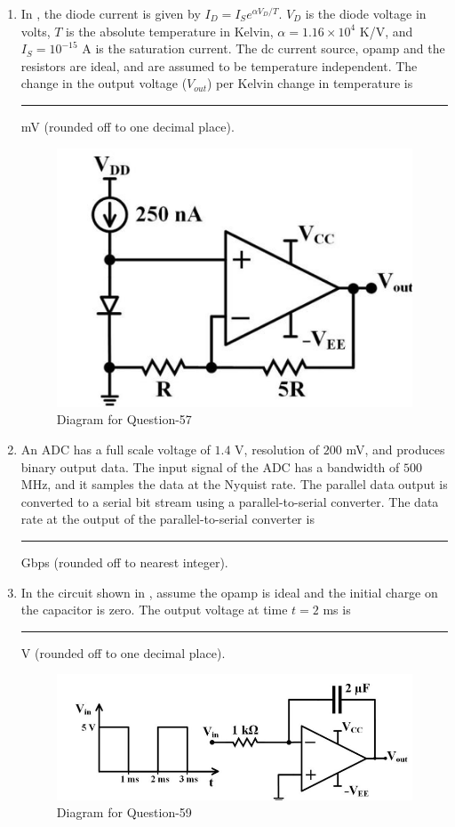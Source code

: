 \documentclass[journal,12pt,onecolumn]{IEEEtran}
\theoremstyle{remark}
\begin{document}
\begin{enumerate}
\item In , the diode current is given by $I_D = I_S e^{\alpha V_D / T}$. $V_D$ is the diode voltage in volts, $T$ is the absolute temperature in Kelvin, $\alpha=1.16 \times 10^{4}$ K/V, and $I_S = 10^{-15}$ A is the saturation current. The dc current source, opamp and the resistors are ideal, and are assumed to be temperature independent. The change in the output voltage ($V_{out}$) per Kelvin change in temperature is \rule{1.5cm}{0.4pt} mV (rounded off to one decimal place).
\par\hfill{}
\begin{figure}[H]
    \centering
    \includegraphics[width=0.3\columnwidth]{Figs/Q-57.png}
    \caption{Diagram for Question-57}
    \label{57}
\end{figure}

\item An ADC has a full scale voltage of $1.4$ V, resolution of $200$ mV, and produces binary output data. The input signal of the ADC has a bandwidth of $500$ MHz, and it samples the data at the Nyquist rate. The parallel data output is converted to a serial bit stream using a parallel-to-serial converter. The data rate at the output of the parallel-to-serial converter is \rule{1.5cm}{0.4pt} Gbps (rounded off to nearest integer).
\par\hfill{}

\item In the circuit shown in , assume the opamp is ideal and the initial charge on the capacitor is zero. The output voltage at time $t=2$ ms is \rule{1.5cm}{0.4pt} V (rounded off to one decimal place).
\par\hfill{}
\begin{figure}[H]
    \centering
    \includegraphics[width=0.4\columnwidth]{Figs/Q-59.png}
    \caption{Diagram for Question-59}
    \label{59}
\end{figure}


\end{enumerate}
\end{document}
